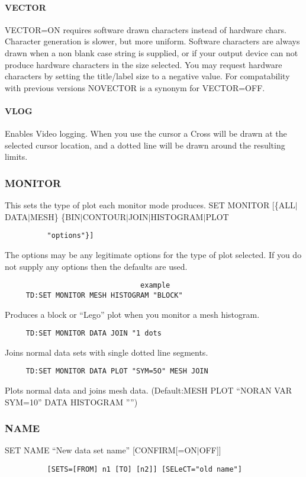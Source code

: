 \paragraph{VECTOR}
VECTOR=ON requires software drawn characters instead of hardware
chars.  Character generation is slower, but more uniform.  Software
characters are always drawn when a non blank case string is supplied,
or if your output device can not produce hardware characters in the
size selected.  You may request hardware characters by setting the
title/label size to a negative value.  For compatability with
previous versions NOVECTOR is a synonym for VECTOR=OFF.  
\paragraph{VLOG}
Enables Video logging.  When you use the cursor a Cross will be drawn
at the selected cursor location, and a dotted line will be drawn
around the resulting limits.  
\subsubsection{MONITOR}
This sets the type of plot each monitor mode produces.  
SET MONITOR [\{ALL$|$DATA$|$MESH\} \{BIN$|$CONTOUR$|$JOIN$|$HISTOGRAM$|$PLOT
\begin{verbatim}
          "options"}] 
\end{verbatim}
The options may be any legitimate options for the type of plot
selected.  If you do not supply any options then the defaults are used. 
\begin{verbatim}
                                example
     TD:SET MONITOR MESH HISTOGRAM "BLOCK" 
\end{verbatim}
Produces a block or ``Lego'' plot when you monitor a mesh histogram.  
\begin{verbatim}
     TD:SET MONITOR DATA JOIN "1 dots 
\end{verbatim}
Joins normal data sets with single dotted line segments.  
\begin{verbatim}
     TD:SET MONITOR DATA PLOT "SYM=5O" MESH JOIN 
\end{verbatim}
Plots normal data and joins mesh data.  
(Default:MESH PLOT ``NORAN VAR SYM=10'' DATA HISTOGRAM '''') 
\subsubsection{NAME}
SET NAME ``New data set name'' [CONFIRM[=ON$|$OFF]]
\begin{verbatim}
          [SETS=[FROM] n1 [TO] [n2]] [SELeCT="old name"] 
\end{verbatim}

